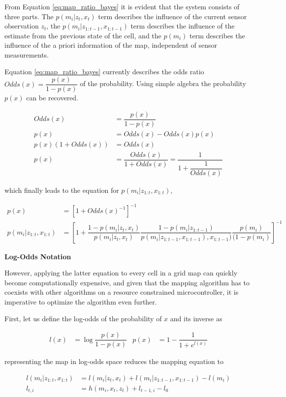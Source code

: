From Equation \ref{eq:map_ratio_bayes} it is evident that the system consists of three parts. The $p(m_i|z_t,x_t)$ term describes the influence of the current sensor observation $z_t$, the $p(m_i|z_{1:t-1},x_{1:t-1})$ term describes the influence of the estimate from the previous state of the cell, and the $p(m_i)$ term describes the influence of the a priori information of the map, independent of sensor measurements.
 
Equation \ref{eq:map_ratio_bayes} currently describes the odds ratio $Odds(x) = \dfrac{p(x)}{1 - p(x)}$ of the probability. Using simple algebra the probability $p(x)$ can be recovered.

\begin{align}
    Odds(x) &= \dfrac{p(x)}{1 - p(x)} \\
    p(x) &= Odds(x) - Odds(x) p(x) \\
    p(x)(1 + Odds(x)) &= Odds(x) \\
    p(x) &= \dfrac{Odds(x)}{1 + Odds(x)} = \dfrac{1}{1 + \dfrac{1}{Odds(x)}}
\end{align}

which finally leads to the equation for $p(m_i|z_{1:t},x_{1:t})$,

\begin{align}
    p(x) &= [1 + Odds(x)^{-1}]^{-1} \\
    p(m_i|z_{1:t},x_{1:t}) &= \left[1 + \dfrac{1 - p(m_i|z_t,x_t)}{p(m_i|z_t,x_t)} \dfrac{1 - p(m_i|z_{1:t-1})}{p(m_i|z_{1:t-1},x_{1:t-1}),x_{1:t-1})} \dfrac{p(m_i)}{(1 - p(m_i)}\right]^{-1}
\end{align}

\textbf{Log-Odds Notation}

However, applying the latter equation to every cell in a grid map can quickly become computationally expensive, and given that the mapping algorithm has to coexists with other algorithms on a resource constrained microcontroller, it is imperative to optimize the algorithm even further.

First, let us define the log-odds of the probability of $x$ and its inverse as

\begin{align}
    l(x) &= \log \dfrac{p(x)}{1 - p(x)} & p(x) &= 1 - \dfrac{1}{1 + e^{l(x)}}
\end{align}

representing the map in log-odds space reduces the mapping equation to

\begin{align}
    l(m_i|z_{1:t},x_{1:t}) &= l(m_i|z_t, x_t) + l(m_i|z_{1:t-1}, x_{1:t-1}) - l(m_i) \\
    l_{t,i} &= h(m_i, x_t, z_t) + l_{t-1,i} - l_0
    \label{eq:logodds_recur}
\end{align}

